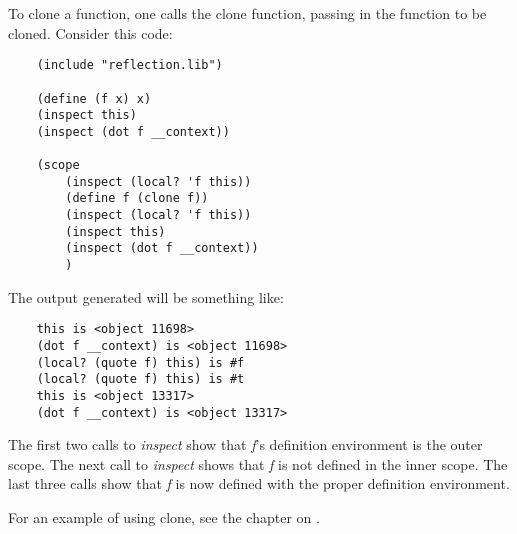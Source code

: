 To clone a function, one calls the clone function, passing
in the function to be cloned. Consider this code:

\begin{verbatim}
    (include "reflection.lib")

    (define (f x) x)
    (inspect this)
    (inspect (dot f __context))

    (scope
        (inspect (local? 'f this))
        (define f (clone f))
        (inspect (local? 'f this))
        (inspect this)
        (inspect (dot f __context))
        )
\end{verbatim}

The output generated will be something like:

\begin{verbatim}
    this is <object 11698>
    (dot f __context) is <object 11698>
    (local? (quote f) this) is #f
    (local? (quote f) this) is #t
    this is <object 13317>
    (dot f __context) is <object 13317>
\end{verbatim}

The first two calls to {\it inspect} show that {\it f}'s definition
environment is the outer scope. The next call to {\it inspect} shows that
{\it f} is not defined in the inner scope. The last three calls show that
{\it f} is now defined with the proper definition environment.

For an example of using clone, see the chapter on
.
